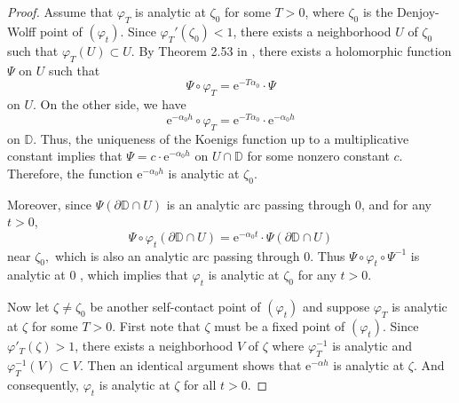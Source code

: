 \documentclass{amsart}
\theoremstyle{proclaim}
\theoremstyle{fancyproclaim}
\theoremstyle{definition}
\theoremstyle{fancystatement}
\numberwithin{equation}{section}
\begin{document}
\begin{proof}
Assume that $\varphi_{T}$ is analytic at $\zeta_0$ for some $T>0$, where $\zeta_0$ is the Denjoy-Wolff point of $(\varphi_t)$. Since $\varphi_T'(\zeta_0)<1$, there exists a neighborhood $U$ of $\zeta_0$ such that $\varphi_T(U) \subset U$. By Theorem 2.53 in \cite{Cowen}, there exists a holomorphic function $\Psi$ on $U$ such that 
$$\Psi\circ\varphi_T= \mathrm{e}^{-T\alpha_0}\cdot\Psi$$
on $U$. On the other side, we have
$$\mathrm{e}^{-\alpha_0h}\circ\varphi_T= \mathrm{e}^{-T\alpha_0}\cdot  \mathrm{e}^{-\alpha_0h}$$
on $\mathbb{D}$. Thus, the uniqueness of the Koenigs function up to a multiplicative constant implies that $\Psi=c\cdot\mathrm{e}^{-\alpha_0h}$ on $U\cap\mathbb{D}$ for some nonzero constant $c$. Therefore, the function $ \mathrm{e}^{-\alpha_0h}$ is analytic at $\zeta_0$.

Moreover, since $\Psi(\partial\mathbb{D}\cap U)$ is an analytic arc passing through $0$, and for any $t>0$,
$$\Psi\circ\varphi_t(\partial\mathbb{D}\cap U)= \mathrm{e}^{-\alpha_0t}\cdot\Psi(\partial\mathbb{D}\cap U)$$
near $\zeta_0,$ which is also an analytic arc passing through $0$. Thus $\Psi\circ\varphi_t\circ\Psi^{-1}$ is analytic at $0$ , which implies that $\varphi_t$ is analytic at $\zeta_0$ for any $t>0$.

Now let $\zeta\ne\zeta_0$ be another self-contact point of $(\varphi_t)$ and suppose $\varphi_T$ is analytic at $\zeta$ for some $T>0$. First note that $\zeta$ must be a fixed point of  $(\varphi_t)$. Since $\varphi'_T(\zeta)>1$, there exists a neighborhood $V$ of $\zeta$ where $\varphi^{-1}_T$ is analytic and $\varphi_T^{-1}(V)\subset V$. Then an identical argument shows that $ \mathrm{e}^{-\alpha h}$ is analytic at $\zeta$. And consequently, $\varphi_t$ is analytic at $\zeta$ for all $t>0$.
\end{proof}
\end{document}
